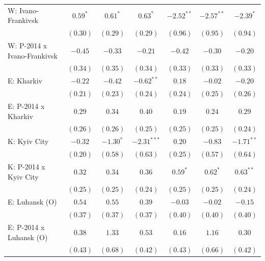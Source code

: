 \begin{table}
\begin{center}
\begin{small}
\begin{tabular}{l c c c c c c}
W: Ivano-Frankivsk          & $0.59^{*}$    & $0.61^{*}$    & $0.63^{*}$     & $-2.52^{**}$  & $-2.57^{**}$  & $-2.39^{*}$   \\
                            & $(0.30)$      & $(0.29)$      & $(0.29)$       & $(0.96)$      & $(0.95)$      & $(0.94)$      \\
W: P-2014 x Ivano-Frankivsk & $-0.45$       & $-0.33$       & $-0.21$        & $-0.42$       & $-0.30$       & $-0.20$       \\
                            & $(0.34)$      & $(0.35)$      & $(0.34)$       & $(0.33)$      & $(0.33)$      & $(0.33)$      \\
E: Kharkiv                  & $-0.22$       & $-0.42$       & $-0.62^{**}$   & $0.18$        & $-0.02$       & $-0.20$       \\
                            & $(0.21)$      & $(0.23)$      & $(0.24)$       & $(0.24)$      & $(0.25)$      & $(0.26)$      \\
E: P-2014 x Kharkiv         & $0.29$        & $0.34$        & $0.40$         & $0.19$        & $0.24$        & $0.29$        \\
                            & $(0.26)$      & $(0.26)$      & $(0.25)$       & $(0.25)$      & $(0.25)$      & $(0.24)$      \\
K: Kyiv City                & $-0.32$       & $-1.30^{*}$   & $-2.31^{***}$  & $0.20$        & $-0.83$       & $-1.71^{**}$  \\
                            & $(0.20)$      & $(0.58)$      & $(0.63)$       & $(0.25)$      & $(0.57)$      & $(0.64)$      \\
K: P-2014 x Kyiv City       & $0.32$        & $0.34$        & $0.36$         & $0.59^{*}$    & $0.62^{*}$    & $0.63^{**}$   \\
                            & $(0.25)$      & $(0.25)$      & $(0.24)$       & $(0.25)$      & $(0.25)$      & $(0.24)$      \\
E: Luhansk (O)              & $0.54$        & $0.55$        & $0.39$         & $-0.03$       & $-0.02$       & $-0.15$       \\
                            & $(0.37)$      & $(0.37)$      & $(0.37)$       & $(0.40)$      & $(0.40)$      & $(0.40)$      \\
E: P-2014 x Luhansk (O)     & $0.38$        & $1.33$        & $0.53$         & $0.16$        & $1.16$        & $0.30$        \\
                            & $(0.43)$      & $(0.68)$      & $(0.42)$       & $(0.43)$      & $(0.66)$      & $(0.42)$      \\

\end{tabular}
\end{small}
\end{center}
\end{table}
